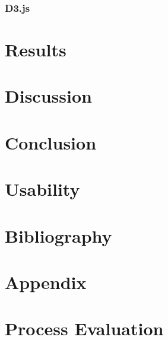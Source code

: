 \documentclass[a4paper,12pt]{article}
\begin{document}
\subsubsection{D3.js} %

\section{Results}

\section{Discussion}

\section{Conclusion}

\section{Usability}

\section{Bibliography}
 
 
\section{Appendix}

\section{Process Evaluation}
\end{document}
